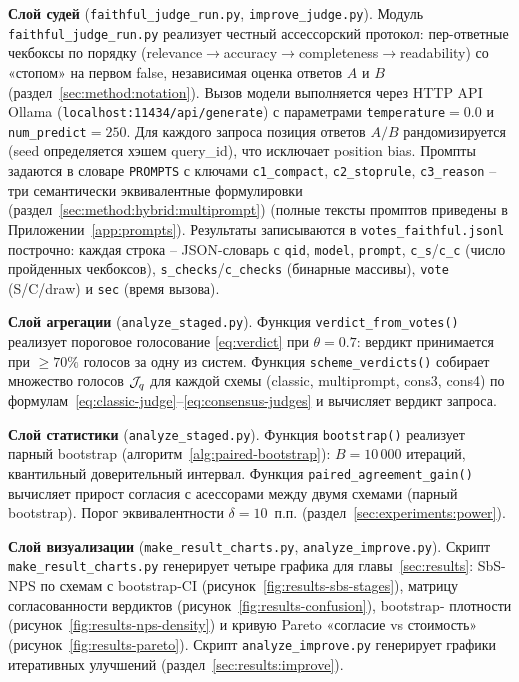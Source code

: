 \textbf{Слой судей} (\texttt{faithful\_judge\_run.py},
\texttt{improve\_judge.py}).
Модуль \texttt{faithful\_judge\_run.py} реализует честный
ассессорский протокол: пер-ответные чекбоксы по порядку
(relevance$\to$accuracy$\to$completeness$\to$readability) со
«стопом» на первом false, независимая оценка ответов $A$ и $B$
(раздел~\ref{sec:method:notation}).
Вызов модели выполняется через HTTP API Ollama
(\texttt{localhost:11434/api/generate}) с параметрами
\texttt{temperature$=0.0$} и \texttt{num\_predict$=250$}.
Для каждого запроса позиция ответов $A/B$ рандомизируется
(seed определяется хэшем query\_id), что исключает position bias.
Промпты задаются в словаре \texttt{PROMPTS} с ключами
\texttt{c1\_compact}, \texttt{c2\_stoprule}, \texttt{c3\_reason}
-- три семантически эквивалентные формулировки
(раздел~\ref{sec:method:hybrid:multiprompt})
(полные тексты промптов приведены в Приложении~\ref{app:prompts}).
Результаты записываются в \texttt{votes\_faithful.jsonl} построчно:
каждая строка -- JSON-словарь с \texttt{qid}, \texttt{model},
\texttt{prompt}, \texttt{c\_s}/\texttt{c\_c} (число пройденных
чекбоксов), \texttt{s\_checks}/\texttt{c\_checks} (бинарные
массивы), \texttt{vote} (S/C/draw) и \texttt{sec} (время вызова).

\textbf{Слой агрегации} (\texttt{analyze\_staged.py}).
Функция \texttt{verdict\_from\_votes()} реализует пороговое
голосование \eqref{eq:verdict} при $\theta = 0.7$: вердикт
принимается при $\ge 70\%$ голосов за одну из систем.
Функция \texttt{scheme\_verdicts()} собирает множество голосов
$\mathcal{J}_q$ для каждой схемы (classic, multiprompt, cons3, cons4)
по формулам~\eqref{eq:classic-judge}--\eqref{eq:consensus-judges}
и вычисляет вердикт запроса.

\textbf{Слой статистики} (\texttt{analyze\_staged.py}).
Функция \texttt{bootstrap()} реализует парный bootstrap
(алгоритм~\ref{alg:paired-bootstrap}): $B = 10\,000$ итераций,
квантильный доверительный интервал.
Функция \texttt{paired\_agreement\_gain()} вычисляет прирост
согласия с асессорами между двумя схемами (парный bootstrap).
Порог эквивалентности $\delta = 10$~п.п.
(раздел~\ref{sec:experiments:power}).

\textbf{Слой визуализации} (\texttt{make\_result\_charts.py},
\texttt{analyze\_improve.py}).
Скрипт \texttt{make\_result\_charts.py} генерирует четыре графика
для главы~\ref{sec:results}: SbS-NPS по схемам с bootstrap-CI
(рисунок~\ref{fig:results-sbs-stages}), матрицу согласованности
вердиктов (рисунок~\ref{fig:results-confusion}), bootstrap-
плотности (рисунок~\ref{fig:results-nps-density}) и кривую
Pareto «согласие vs стоимость» (рисунок~\ref{fig:results-pareto}).
Скрипт \texttt{analyze\_improve.py} генерирует графики
итеративных улучшений (раздел~\ref{sec:results:improve}).
